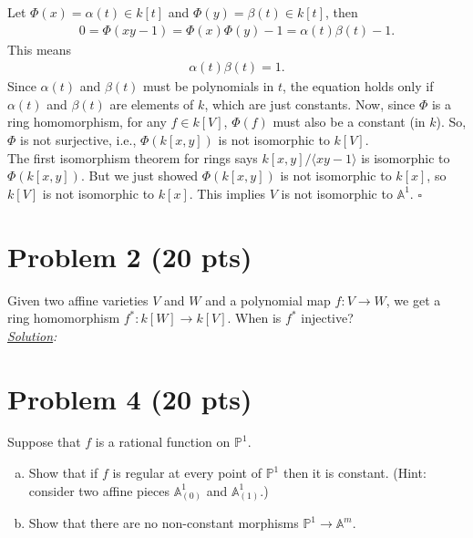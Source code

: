 \documentclass[12pt]{article}
\newcommand{\A}{\mathbb{A}}
\begin{document}
Let $\Phi(x) = \alpha(t) \in k[t]$ and $\Phi(y) = \beta(t)\in k[t]$, then 
\begin{align*}
0 = \Phi(xy-1) = \Phi(x)\Phi(y)-1 = \alpha(t)\beta(t) - 1. 
\end{align*}
This means 
\begin{align*}
\alpha(t)\beta(t) = 1.
\end{align*}
Since $\alpha(t)$ and $\beta(t)$ must be polynomials in $t$, the equation holds only if $\alpha(t)$ and $\beta(t)$ are elements of $k$, which are just constants. Now, since $\Phi$ is a ring homomorphism, for any $f\in k[V]$, $\Phi(f)$ must also be a constant (in $k$). So, $\Phi$ is not surjective, i.e., $\Phi(k[x,y])$ is not isomorphic to $k[V]$. \\

The first isomorphism theorem for rings says $k[x,y]/\langle xy-1\rangle$ is isomorphic to $\Phi(k[x,y])$. But we just showed $\Phi(k[x,y])$ is not isomorphic to $k[x]$, so $k[V]$ is not isomorphic to $k[x]$. This implies $V$ is not isomorphic to $\A^1$.   \hfill$\square$


\newpage



















\section*{Problem 2 \small{(20 pts)}}

Given two affine varieties $V$ and $W$ and a polynomial map $f: V\to W$, we get a ring homomorphism $f^* : k[W] \to k[V]$. When is $f^*$ injective?\\

\noindent \textit{\underline{Solution}:} 




\newpage
















\section*{Problem 4 \small{(20 pts)}}
Suppose that $f$ is a rational function on $\mathbb{P}^1$.
\begin{enumerate}[(a)]
	\item Show that if $f$ is regular at every point of $\mathbb{P}^1$ then it is constant. (Hint: consider two affine pieces $\A_{(0)}^1$ and $\A^1_{(1)}$.)
	
	
	\item Show that there are no non-constant morphisms $\mathbb{P}^1 \to \A^m$.
\end{enumerate}
\end{document}
